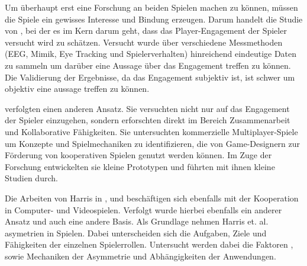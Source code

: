 Um überhaupt erst eine Forschung an beiden Spielen machen zu können, müssen die Spiele ein gewisses Interesse und Bindung erzeugen. Darum handelt die Studie von \cite{rashed_review_2025}, bei der es im Kern darum geht, dass das Player-Engagement der Spieler versucht wird zu schätzen. Versucht wurde über verschiedene Messmethoden (EEG, Mimik, Eye Tracking und Spielerverhalten) hinreichend eindeutige Daten zu sammeln um darüber eine Aussage über das Engagement treffen zu können. Die Validierung der Ergebnisse, da das Engagement subjektiv ist, ist schwer um objektiv eine  aussage treffen zu können. 

\cite{yu_video_2023} verfolgten einen anderen Ansatz. Sie versuchten nicht nur auf das Engagement der Spieler einzugehen, sondern erforschten direkt im Bereich Zusammenarbeit und Kollaborative Fähigkeiten. Sie untersuchten kommerzielle Multiplayer-Spiele um Konzepte und Spielmechaniken zu identifizieren, die von Game-Designern zur Förderung von kooperativen Spielen genutzt werden können. Im Zuge der Forschung entwickelten sie kleine Prototypen und führten mit ihnen kleine Studien durch. 

Die Arbeiten von Harris in \cite{harris_beam_2014}, \cite{harris_leveraging_2016} und \cite{harris_asymmetry_2019} beschäftigen sich ebenfalls mit der Kooperation in Computer- und Videospielen. Verfolgt wurde hierbei ebenfalls ein anderer Ansatz und auch eine andere Basis. Als Grundlage nehmen Harris et. al. asymetrien in Spielen. Dabei unterscheiden sich die Aufgaben, Ziele und Fähigkeiten der einzelnen Spielerrollen. Untersucht werden dabei die Faktoren ,  sowie Mechaniken der Asymmetrie und Abhängigkeiten der Anwendungen.





